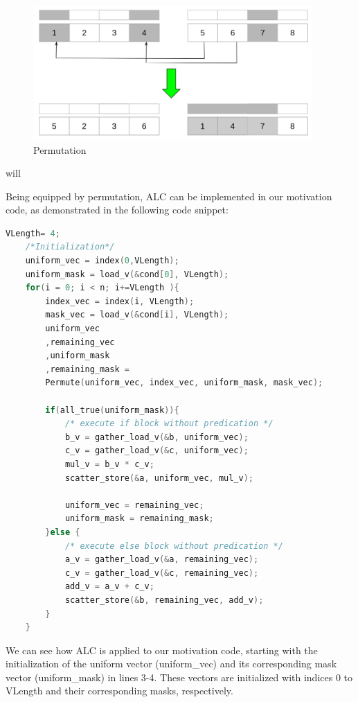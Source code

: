 \documentclass[\main/thesis.tex]{subfiles}
\begin{document}
\begin{figure}[t!]
    \centering
    \includegraphics[width=0.95\textwidth]{img/permutation.png}
    \caption{Permutation}
    \label{fig:Permutation}
\end{figure}will

Being equipped by permutation, ALC can be implemented in our motivation code, as demonstrated in the following code snippet:

\begin{lstlisting}[language=C]
    VLength= 4;
    /*Initialization*/
    uniform_vec = index(0,VLength);
    uniform_mask = load_v(&cond[0], VLength);
    for(i = 0; i < n; i+=VLength ){
        index_vec = index(i, VLength);
        mask_vec = load_v(&cond[i], VLength);
        uniform_vec 
        ,remaining_vec
        ,uniform_mask
        ,remaining_mask =
        Permute(uniform_vec, index_vec, uniform_mask, mask_vec); 
                
        if(all_true(uniform_mask)){
            /* execute if block without predication */
            b_v = gather_load_v(&b, uniform_vec);
            c_v = gather_load_v(&c, uniform_vec);
            mul_v = b_v * c_v;
            scatter_store(&a, uniform_vec, mul_v);

            uniform_vec = remaining_vec;
            uniform_mask = remaining_mask;
        }else {     
            /* execute else block without predication */
            a_v = gather_load_v(&a, remaining_vec);
            c_v = gather_load_v(&c, remaining_vec);
            add_v = a_v + c_v;
            scatter_store(&b, remaining_vec, add_v);
        } 
    }
\end{lstlisting}

We can see how ALC is applied to our motivation code, starting with the initialization of the uniform vector (uniform\_vec) and its corresponding mask vector (uniform\_mask) in lines 3-4. These vectors are initialized with indices 0 to VLength and their corresponding masks, respectively.
\end{document}
